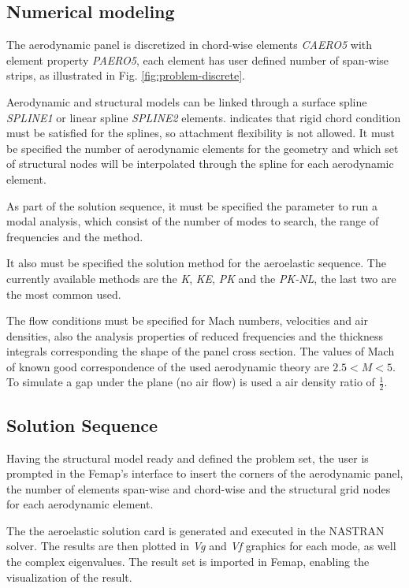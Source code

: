 \subsection{Numerical modeling}

The aerodynamic panel is discretized in chord-wise elements \emph{CAERO5} with element property \emph{PAERO5}, each element has user defined number of span-wise strips, as illustrated in Fig. \ref{fig:problem-discrete}. 



Aerodynamic and structural models can be linked through a surface spline \emph{SPLINE1} or linear spline \emph{SPLINE2} elements.
\citet{siemens_nx_2014} indicates that rigid chord condition must be satisfied for the splines, so attachment flexibility is not allowed.
It must be specified the number of aerodynamic elements for the geometry and which set of structural nodes will be interpolated through the spline for each aerodynamic element.

As part of the solution sequence, it must be specified the parameter to run a modal analysis, which consist of the number of modes to search, the range of frequencies and the method.

It also must be specified the solution method for the aeroelastic sequence. The currently available methods are the \emph{K}, \emph{KE}, \emph{PK} and the \emph{PK-NL}, the last two are the most common used.

The flow conditions must be specified for Mach numbers, velocities and air densities, also the analysis properties of reduced frequencies and the thickness integrals corresponding the shape of the panel cross section. The values of Mach of known good correspondence of the used aerodynamic theory are $2.5 < M < 5$. To simulate a gap under the plane (no air flow) is used a air density ratio of $\frac{1}{2}$.
\cite{siemens_nx_2014}

\subsection{Solution Sequence}

Having the structural model ready and defined the problem set, the user is prompted in the Femap's interface to insert the corners of the aerodynamic panel, the number of elements span-wise and chord-wise and the structural grid nodes for each aerodynamic element.


The the aeroelastic solution card is generated and executed in the NASTRAN solver.
The results are then plotted in \emph{Vg} and \emph{Vf} graphics for each mode, as well the complex eigenvalues.
The result set is imported in Femap, enabling the visualization of the result.